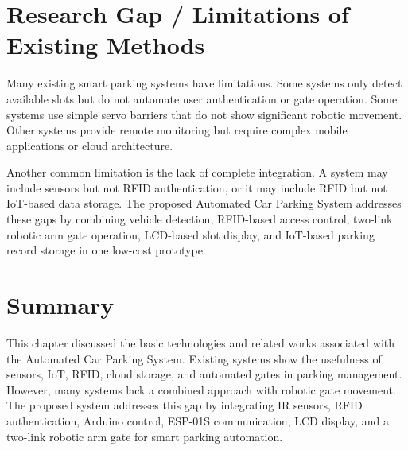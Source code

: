 \section{Research Gap / Limitations of Existing Methods}

Many existing smart parking systems have limitations. Some systems only detect available slots but do not automate user authentication or gate operation. Some systems use simple servo barriers that do not show significant robotic movement. Other systems provide remote monitoring but require complex mobile applications or cloud architecture.

Another common limitation is the lack of complete integration. A system may include sensors but not RFID authentication, or it may include RFID but not IoT-based data storage. The proposed Automated Car Parking System addresses these gaps by combining vehicle detection, RFID-based access control, two-link robotic arm gate operation, LCD-based slot display, and IoT-based parking record storage in one low-cost prototype.

\section{Summary}

This chapter discussed the basic technologies and related works associated with the Automated Car Parking System. Existing systems show the usefulness of sensors, IoT, RFID, cloud storage, and automated gates in parking management. However, many systems lack a combined approach with robotic gate movement. The proposed system addresses this gap by integrating IR sensors, RFID authentication, Arduino control, ESP-01S communication, LCD display, and a two-link robotic arm gate for smart parking automation.

